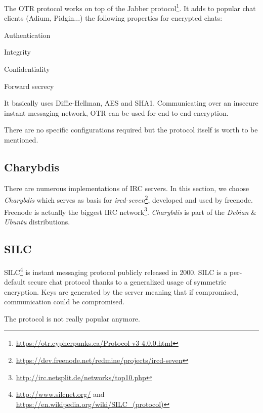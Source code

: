 The OTR protocol works on top of the Jabber protocol\footnote{\url{https://otr.cypherpunks.ca/Protocol-v3-4.0.0.html}}.  
It adds to popular chat clients (Adium, Pidgin...) the following properties for encrypted chats:
\begin{itemize*}
  \item Authentication
  \item Integrity
  \item Confidentiality
  \item Forward secrecy
\end{itemize*}

It basically uses Diffie-Hellman, AES and SHA1. Communicating over an insecure instant messaging network, OTR can be used for end to end encryption.

There are no specific configurations required but the protocol itself is worth to be mentioned.


\subsection{Charybdis}
There are numerous implementations of IRC servers.  In this section, we choose \emph{Charybdis} which serves as basis for \emph{ircd-seven}\footnote{\url{https://dev.freenode.net/redmine/projects/ircd-seven}}, developed and used by freenode. Freenode is actually the biggest IRC network\footnote{\url{http://irc.netsplit.de/networks/top10.php}}. \emph{Charybdis} is part of the \emph{Debian} \& \emph{Ubuntu} distributions.


\subsection{SILC}

SILC\footnote{\url{http://www.silcnet.org/} and
\url{https://en.wikipedia.org/wiki/SILC_(protocol)}} is instant messaging
protocol publicly released in 2000. SILC is a per-default secure chat protocol
thanks to a generalized usage of symmetric encryption. Keys are generated by
the server meaning that if compromised, communication could be compromised.

The protocol is not really popular anymore.


